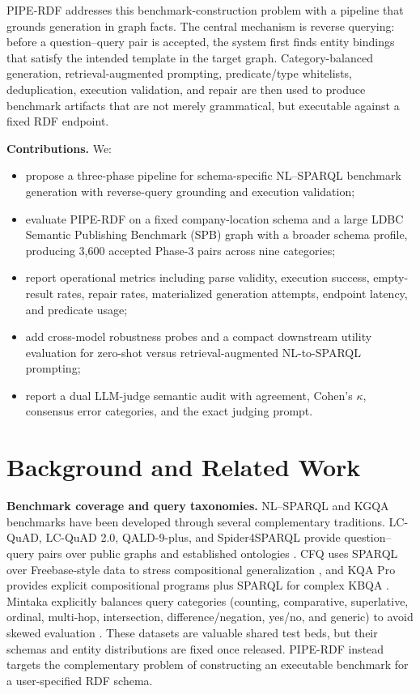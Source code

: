 \documentclass[11pt]{article}
\begin{document}
PIPE-RDF addresses this benchmark-construction problem with a pipeline that grounds generation in graph facts. The central mechanism is reverse querying: before a question--query pair is accepted, the system first finds entity bindings that satisfy the intended template in the target graph. Category-balanced generation, retrieval-augmented prompting, predicate/type whitelists, deduplication, execution validation, and repair are then used to produce benchmark artifacts that are not merely grammatical, but executable against a fixed RDF endpoint.

\textbf{Contributions.} We:
\begin{itemize}
  \item propose a three-phase pipeline for schema-specific NL--SPARQL benchmark generation with reverse-query grounding and execution validation;
  \item evaluate PIPE-RDF on a fixed company-location schema and a large LDBC Semantic Publishing Benchmark (SPB) graph with a broader schema profile, producing 3{,}600 accepted Phase-3 pairs across nine categories;
  \item report operational metrics including parse validity, execution success, empty-result rates, repair rates, materialized generation attempts, endpoint latency, and predicate usage;
  \item add cross-model robustness probes and a compact downstream utility evaluation for zero-shot versus retrieval-augmented NL-to-SPARQL prompting;
  \item report a dual LLM-judge semantic audit with agreement, Cohen's \(\kappa\), consensus error categories, and the exact judging prompt.
\end{itemize}

\section{Background and Related Work}
\textbf{Benchmark coverage and query taxonomies.} NL--SPARQL and KGQA benchmarks have been developed through several complementary traditions. LC-QuAD, LC-QuAD 2.0, QALD-9-plus, and Spider4SPARQL provide question--query pairs over public graphs and established ontologies \citep{Trivedi_2017,DBLP:conf/semweb/DubeyBA019,perevalov2022qald9plusmultilingualdatasetquestion,DBLP:conf/bigdataconf/KostenCS23}. CFQ uses SPARQL over Freebase-style data to stress compositional generalization \citep{keysers2020cfq}, and KQA Pro provides explicit compositional programs plus SPARQL for complex KBQA \citep{cao-etal-2022-kqa}. Mintaka explicitly balances query categories (counting, comparative, superlative, ordinal, multi-hop, intersection, difference/negation, yes/no, and generic) to avoid skewed evaluation \citep{sen2022mintakacomplexnaturalmultilingual}. These datasets are valuable shared test beds, but their schemas and entity distributions are fixed once released. PIPE-RDF instead targets the complementary problem of constructing an executable benchmark for a user-specified RDF schema.
\end{document}
